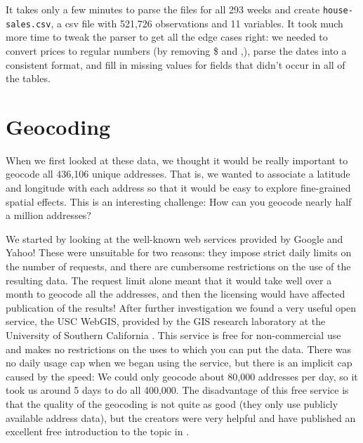 \documentclass[oneside]{article}
\begin{document}
It takes only a few minutes to parse the files for all 293 weeks and create {\tt house-sales.csv}, a csv file with 521,726 observations and 11 variables.  It took much more time to tweak the parser to get all the edge cases right: we needed to convert prices to regular numbers (by removing \$ and ,), parse the dates into a consistent format, and fill in missing values for fields that didn't occur in all of the tables. 



\section{Geocoding} 

When we first looked at these data, we thought it would be really important to geocode all 436,106 unique addresses.  That is, we wanted to associate a latitude and longitude with each address so that it would be easy to explore fine-grained spatial effects. This is an interesting challenge: How can you geocode nearly half a million addresses? 

We started by looking at the well-known web services provided by Google and Yahoo! These were unsuitable for two reasons: they impose strict daily limits on the number of requests, and there are cumbersome restrictions on the use of the resulting data.  The request limit alone meant that it would take well over a month to geocode all the addresses, and then the licensing would have affected publication of the results! After further investigation we found a very useful open service, the USC WebGIS, provided by the GIS research laboratory at the University of Southern California \citep{uscgis}.  This service is free for non-commercial use and makes no restrictions on the uses to which you can put the data.  There was no daily usage cap when we began using the service, but there is an implicit cap caused by the speed: We could only geocode about 80,000 addresses per day, so it took us around 5 days to do all 400,000.  The disadvantage of this free service is that the quality of the geocoding is not quite as good (they only use publicly available address data), but the creators were very helpful and have published an excellent free introduction to the topic in \citet{goldberg:2008}.  
\end{document}
